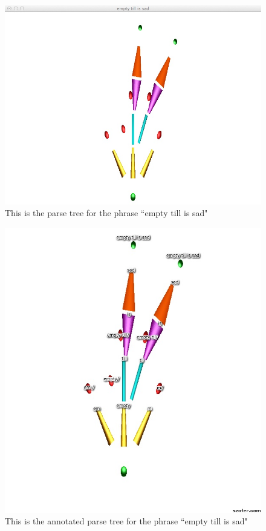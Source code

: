 \begin{figure}
\includegraphics[width=150mm]{emptyTillIsSad.jpg}
\captionfonts
\caption[Oronym Parse Tree]{ This is the parse tree for the phrase ``empty till is sad" }
\label{fig:treeEmptyTillIsSad}
\end{figure}

\begin{figure}
\includegraphics[width=150mm]{emptyTillIsSadAnnotated.jpg}
\captionfonts
\caption[Annotated Oronym Parse Tree]{ This is the annotated parse tree for the phrase ``empty till is sad" }
\label{fig:treeEmptyTillIsSadAnnotated}
\end{figure}



